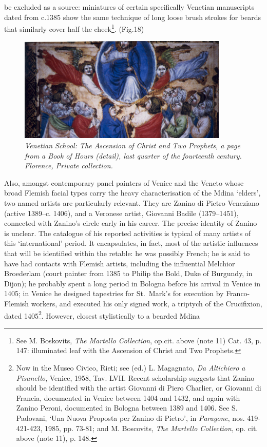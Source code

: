 \documentclass[a4paper,12pt]{article}
\begin{document}
be excluded as a source: miniatures of certain specifically Venetian
manuscripts dated from c.1385 show the same technique of long loose
brush strokes for beards that similarly cover half the
cheek\footnote{See M. Boskovits, \textit{The Martello Collection},
op.cit. above (note 11) Cat. 43, p. 147: illuminated leaf with the
Ascension of Christ and Two Prophets.}. (Fig.18) 
\begin{figure}[htbp]
\centering
\includegraphics[width=10cm]{pics/fig18.png}
\caption[Venetian School: The Ascension of Christ and Two
  Prophets, a page from a Book of Hours (detail)]
{\it Venetian School: The Ascension of Christ and Two
  Prophets, a page from a Book of Hours (detail), last quarter of the
  fourteenth century. Florence, Private collection.}
\end{figure}
Also, amongst
contemporary panel painters of Venice and the Veneto whose broad
Flemish facial types carry the heavy characterisation of the Mdina
`elders', two named artists are particularly relevant.  They are
Zanino di Pietro Veneziano (active 1389--c. 1406), and a Veronese
artist, Giovanni Badile (1379--1451), connected with Zanino's circle
early in his career. The precise identity of Zanino is unclear. The
catalogue of his reported activities is typical of many artists of
this `international' period. It encapsulates, in fact, most of the
artistic influences that will be identified within the retable: he was
possibly French; he is said to have had contacts with Flemish artists,
including the influential Melchior Broederlam (court painter from 1385
to Philip the Bold, Duke of Burgundy, in Dijon); he probably spent a
long period in Bologna before his arrival in Venice in 1405; in Venice
he designed tapestries for St.~Mark's for execution by Franco-Flemish
workers, and executed his only signed work, a triptych of the
Crucifixion, dated 1405\footnote{Now in the Museo Civico, Rieti; see
(ed.) L. Magagnato, \textit{Da Altichiero a Pisanello}, Venice, 1958,
Tav. LVII.  Recent scholarship suggests that Zanino should be
identified with the artist Giovanni di Piero Charlier, or Giovanni di
Francia, documented in Venice between 1404 and 1432, and again with
Zanino Peroni, documented in Bologna between 1389 and 1406.  See
S. Padovani, `Una Nuova Proposta per Zanino di Pietro', in
\textit{Paragone}, nos. 419-421-423, 1985, pp. 73-81; and
M. Boscovits, \textit{The Martello Collection}, op. cit. above (note
11), p. 148.}.  However, closest stylistically to a bearded Mdina
\end{document}
